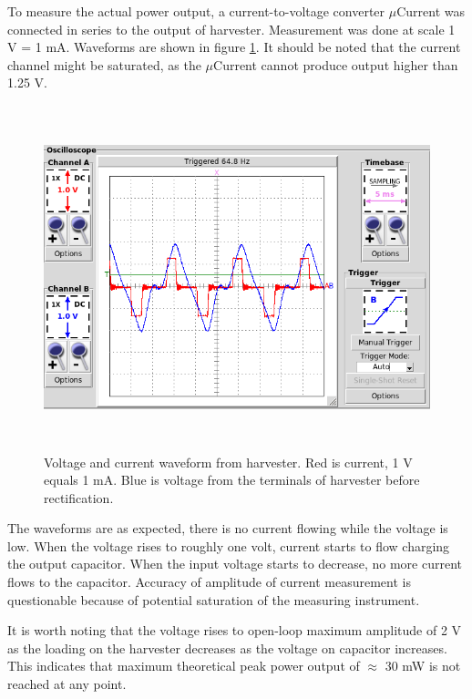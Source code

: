 To measure the actual power output, a current-to-voltage converter $\mu$Current \cite{Jones2010} was connected in series to the output of harvester. Measurement was done at scale 1 V = 1 mA. Waveforms are shown in figure \ref{fig:inductive_vi_65}. It should be noted that the current channel might be saturated, as the $\mu$Current cannot produce output higher than 1.25 V.

\begin{figure}[htb]
\begin{center}
\includegraphics[height=10cm]{images/own_measurement/generator_shaker/inductive_td_harvesting_vi_65hz_ferro.png}
\end{center}
\caption{\label{fig:inductive_vi_65} Voltage and current waveform from harvester. Red is current, 1 V equals 1 mA. Blue is voltage from the terminals of harvester before rectification.}
\end{figure}

The waveforms are as expected, there is no current flowing while the voltage is low. When the voltage rises to roughly one volt, current starts to flow charging the output capacitor. When the input voltage starts to decrease, no more current flows to the capacitor. Accuracy of amplitude of current measurement is questionable because of potential saturation of the measuring instrument.

It is worth noting that the voltage rises to open-loop maximum amplitude of 2 V as the loading on the harvester decreases as the voltage on capacitor increases. This indicates that maximum theoretical peak power output of $\approx$ 30 mW is not reached at any point. 

